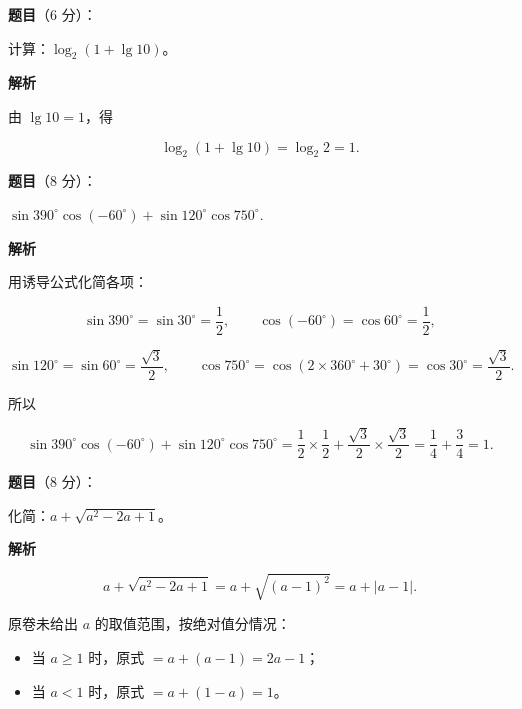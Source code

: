 \begin{answer}

\textbf{题目}（6 分）：

计算：$\log_2(1+\lg10)$。

\textbf{解析}

由 $\lg10=1$，得

\nopagebreak[4]
\[
\log_2(1+\lg10)=\log_2 2=1.
\]


\end{answer}
\begin{answer}

\textbf{题目}（8 分）：

$\sin390^\circ\cos(-60^\circ)+\sin120^\circ\cos750^\circ.$

\textbf{解析}

用诱导公式化简各项：

\nopagebreak[4]
\[
\sin390^\circ=\sin30^\circ=\frac{1}{2},\qquad
\cos(-60^\circ)=\cos60^\circ=\frac{1}{2},
\]

\nopagebreak[4]
\[
\sin120^\circ=\sin60^\circ=\frac{\sqrt{3}}{2},\qquad
\cos750^\circ=\cos(2\times360^\circ+30^\circ)=\cos30^\circ=\frac{\sqrt{3}}{2}.
\]

所以

\nopagebreak[4]
\[
\sin390^\circ\cos(-60^\circ)+\sin120^\circ\cos750^\circ
=\frac{1}{2}\times\frac{1}{2}+\frac{\sqrt{3}}{2}\times\frac{\sqrt{3}}{2}
=\frac{1}{4}+\frac{3}{4}=1.
\]


\end{answer}
\begin{answer}

\textbf{题目}（8 分）：

化简：$a+\sqrt{a^2-2a+1}$。

\textbf{解析}

\nopagebreak[4]
\[
a+\sqrt{a^2-2a+1}=a+\sqrt{(a-1)^2}=a+|a-1|.
\]

原卷未给出 $a$ 的取值范围，按绝对值分情况：

\begin{itemize}
\item 当 $a\ge1$ 时，原式 $=a+(a-1)=2a-1$；
\item 当 $a<1$ 时，原式 $=a+(1-a)=1$。
\end{itemize}


\end{answer}

